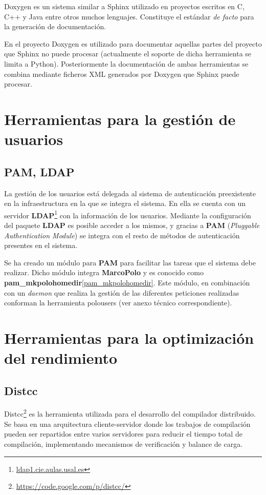 Doxygen es un sistema similar a Sphinx utilizado en proyectos escritos en C, C++ y Java entre otros muchos lenguajes. Constituye el estándar \textit{de facto} para la generación de documentación.

En el proyecto Doxygen es utilizado para documentar aquellas partes del proyecto que Sphinx no puede procesar (actualmente el soporte de dicha herramienta se limita a Python). Posteriormente la documentación de ambas herramientas se combina mediante ficheros XML generados por Doxygen que Sphinx puede procesar.

\section{Herramientas para la gestión de usuarios}

\subsection{PAM, LDAP}
\label{polousers}
La gestión de los usuarios está delegada al sistema de autenticación preexistente en la infraestructura en la que se integra el sistema. En ella se cuenta con un servidor \textbf{LDAP}\footnote{\href{ldap1.cie.aulas.usal.es}{ldap1.cie.aulas.usal.es}} con la información de los usuarios. Mediante la configuración del paquete \textbf{LDAP} es posible acceder a los mismos, y gracias a \textbf{PAM} (\textit{Pluggable Authentication Module}) se integra con el resto de métodos de autenticación presentes en el sistema.

Se ha creado un módulo para \textbf{PAM} para facilitar las tareas que el sistema debe realizar. Dicho módulo integra \textbf{MarcoPolo} y es conocido como \textbf{pam\_mkpolohomedir}\ref{pam_mkpolohomedir}. Este módulo, en combinación con un \textit{daemon} que realiza la gestión de las diferentes peticiones realizadas conforman la herramienta polousers (ver anexo técnico correspondiente).

\section{Herramientas para la optimización del rendimiento}

\subsection{Distcc}

Distcc\footnote{\href{https://code.google.com/p/distcc/}{https://code.google.com/p/distcc/}} es la herramienta utilizada para el desarrollo del compilador distribuido. Se basa en una arquitectura cliente-servidor donde los trabajos de compilación pueden ser repartidos entre varios servidores para reducir el tiempo total de compilación, implementando mecanismos de verificación y balance de carga.

